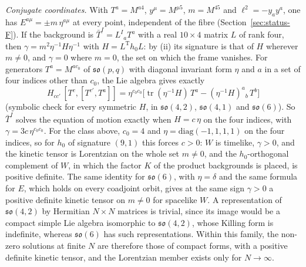 \emph{Conjugate coordinates.} With \(T^a=M^{a4}\), \(y^\mu=M^{\mu5}\), \(m=M^{45}\) and \(\ell^2=-y_ay^a\), one has \(E^{a\mu}=\pm m\,\eta^{a\mu}\) at every point, independent of the fibre (Section~\ref{sec:status-F}). If the background is \(\bar T^I=L^I{}_aT^a\) with a real \(10\times4\) matrix \(L\) of rank four, then \(\gamma=m^2\eta^{-1}H\eta^{-1}\) with \(H=L^{\mathrm T}h_0L\): by (ii) its signature is that of \(H\) wherever \(m\neq0\), and \(\gamma=0\) where \(m=0\), the set on which the frame vanishes. For generators \(T^a=M^{ac_0}\) of \(\mathfrak{so}(p,q)\) with diagonal invariant form \(\eta\) and \(a\) in a set of four indices other than \(c_0\), the Lie algebra gives exactly
\[
H_{cc'}\,[T^c,[T^{c'},T^a]]=\eta^{c_0c_0}\bigl[\operatorname{tr}(\eta^{-1}H)\,T^a-(\eta^{-1}H)^a{}_b\,T^b\bigr]
\]
(symbolic check for every symmetric \(H\), in \(\mathfrak{so}(4,2)\), \(\mathfrak{so}(4,1)\) and \(\mathfrak{so}(6)\)). So \(\bar T^I\) solves the equation of motion exactly when \(H=c\,\eta\) on the four indices, with \(\gamma=3c\,\eta^{c_0c_0}\). For the class above, \(c_0=4\) and \(\eta=\mathrm{diag}(-1,1,1,1)\) on the four indices, so for \(h_0\) of signature \((9,1)\) this forces \(c>0\): \(W\) is timelike, \(\gamma>0\), and the kinetic tensor is Lorentzian on the whole set \(m\neq0\), and the \(h_0\)-orthogonal complement of \(W\), in which the factor \(K\) of the product backgrounds is placed, is positive definite. The same identity for \(\mathfrak{so}(6)\), with \(\eta=\delta\) and the same formula for \(E\), which holds on every coadjoint orbit, gives at the same sign \(\gamma>0\) a positive definite kinetic tensor on \(m\neq0\) for spacelike \(W\). A representation of \(\mathfrak{so}(4,2)\) by Hermitian \(N\times N\) matrices is trivial, since its image would be a compact simple Lie algebra isomorphic to \(\mathfrak{so}(4,2)\), whose Killing form is indefinite, whereas \(\mathfrak{so}(6)\) has such representations. Within this family, the non-zero solutions at finite \(N\) are therefore those of compact forms, with a positive definite kinetic tensor, and the Lorentzian member exists only for \(N\to\infty\).

